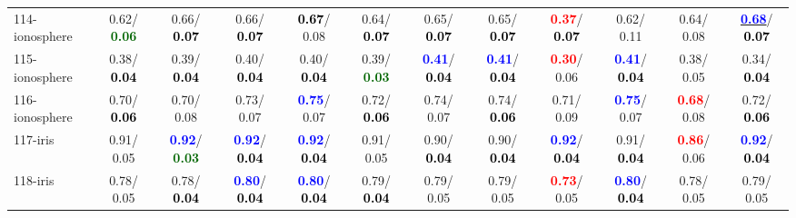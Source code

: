 \begin{table}[h]
\begin{center}
{\begin{tabular}{lc|c|c|c|c|c|c|c|c|c|c}
114-ionosphere &   0.62/\textcolor{darkgreen}{\textbf{  0.06}} &   0.66/\textcolor{black}{\textbf{  0.07}} &   0.66/\textcolor{black}{\textbf{  0.07}} & \textcolor{black}{\textbf{  0.67}}/  0.08 &   0.64/\textcolor{black}{\textbf{  0.07}} &   0.65/\textcolor{black}{\textbf{  0.07}} &   0.65/\textcolor{black}{\textbf{  0.07}} & \textcolor{red}{\textbf{  0.37}}/\textcolor{black}{\textbf{  0.07}} &   0.62/  0.11 &   0.64/  0.08 & \underline{\textcolor{blue}{\textbf{  0.68}}}/\textcolor{black}{\textbf{  0.07}} \\
115-ionosphere &   0.38/\textcolor{black}{\textbf{  0.04}} &   0.39/\textcolor{black}{\textbf{  0.04}} &   0.40/\textcolor{black}{\textbf{  0.04}} &   0.40/\textcolor{black}{\textbf{  0.04}} &   0.39/\textcolor{darkgreen}{\textbf{  0.03}} & \textcolor{blue}{\textbf{  0.41}}/\textcolor{black}{\textbf{  0.04}} & \textcolor{blue}{\textbf{  0.41}}/\textcolor{black}{\textbf{  0.04}} & \textcolor{red}{\textbf{  0.30}}/  0.06 & \textcolor{blue}{\textbf{  0.41}}/\textcolor{black}{\textbf{  0.04}} &   0.38/  0.05 &   0.34/\textcolor{black}{\textbf{  0.04}} \\
116-ionosphere &   0.70/\textcolor{black}{\textbf{  0.06}} &   0.70/  0.08 &   0.73/  0.07 & \textcolor{blue}{\textbf{  0.75}}/  0.07 &   0.72/\textcolor{black}{\textbf{  0.06}} &   0.74/  0.07 &   0.74/\textcolor{black}{\textbf{  0.06}} &   0.71/  0.09 & \textcolor{blue}{\textbf{  0.75}}/  0.07 & \textcolor{red}{\textbf{  0.68}}/  0.08 &   0.72/\textcolor{black}{\textbf{  0.06}} \\
117-iris &   0.91/  0.05 & \textcolor{blue}{\textbf{  0.92}}/\textcolor{darkgreen}{\textbf{  0.03}} & \textcolor{blue}{\textbf{  0.92}}/\textcolor{black}{\textbf{  0.04}} & \textcolor{blue}{\textbf{  0.92}}/\textcolor{black}{\textbf{  0.04}} &   0.91/  0.05 &   0.90/\textcolor{black}{\textbf{  0.04}} &   0.90/\textcolor{black}{\textbf{  0.04}} & \textcolor{blue}{\textbf{  0.92}}/\textcolor{black}{\textbf{  0.04}} &   0.91/\textcolor{black}{\textbf{  0.04}} & \textcolor{red}{\textbf{  0.86}}/  0.06 & \textcolor{blue}{\textbf{  0.92}}/\textcolor{black}{\textbf{  0.04}} \\ \hline
118-iris &   0.78/  0.05 &   0.78/\textcolor{black}{\textbf{  0.04}} & \textcolor{blue}{\textbf{  0.80}}/\textcolor{black}{\textbf{  0.04}} & \textcolor{blue}{\textbf{  0.80}}/\textcolor{black}{\textbf{  0.04}} &   0.79/\textcolor{black}{\textbf{  0.04}} &   0.79/  0.05 &   0.79/  0.05 & \textcolor{red}{\textbf{  0.73}}/  0.05 & \textcolor{blue}{\textbf{  0.80}}/\textcolor{black}{\textbf{  0.04}} &   0.78/  0.05 &   0.79/  0.05 \\

\end{tabular}}
\end{center}
\end{table}
